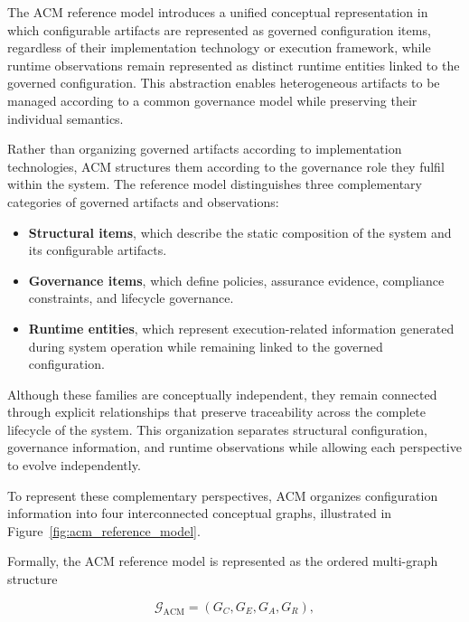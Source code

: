 \documentclass[10pt]{article}
\begin{document}
The ACM reference model introduces a unified conceptual representation in which configurable artifacts are represented as governed configuration items, regardless of their implementation technology or execution framework, while runtime observations remain represented as distinct runtime entities linked to the governed configuration. This abstraction enables heterogeneous artifacts to be managed according to a common governance model while preserving their individual semantics.

Rather than organizing governed artifacts according to implementation
technologies, ACM structures them according to the governance role they fulfil within the system. The reference model distinguishes three complementary categories of governed artifacts and observations:

\begin{itemize}

\item \textbf{Structural items}, which describe the static composition of the system and its configurable artifacts.

\item \textbf{Governance items}, which define policies, assurance evidence, compliance constraints, and lifecycle governance.

\item \textbf{Runtime entities}, which represent execution-related information generated during system operation while remaining linked to the governed configuration.

\end{itemize}

Although these families are conceptually independent, they remain connected through explicit relationships that preserve traceability across the complete lifecycle of the system. This organization separates structural configuration, governance information, and runtime observations while allowing each perspective to evolve independently.

To represent these complementary perspectives, ACM organizes configuration information into four interconnected conceptual graphs, illustrated in Figure~\ref{fig:acm_reference_model}.

Formally, the ACM reference model is represented as the ordered multi-graph structure

\begin{equation}
	\mathcal{G}_{\mathrm{ACM}}
	=
	\left(
	G_C,
	G_E,
	G_A,
	G_R
	\right),
	\label{eq:acm_multigraph_structure}
\end{equation}
\end{document}
